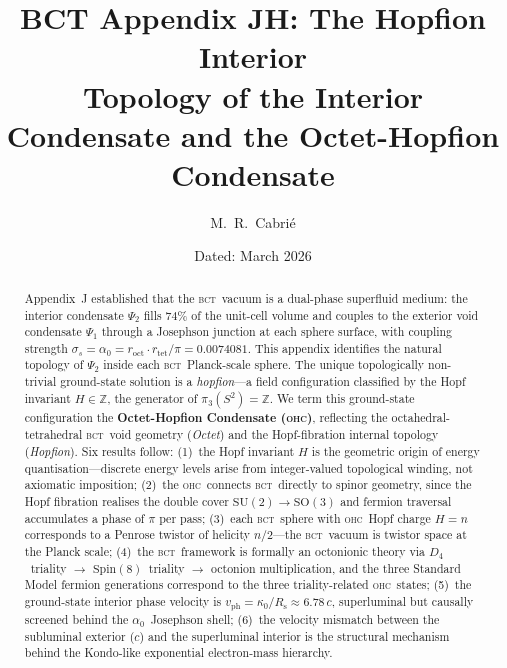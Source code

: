 \documentclass[aps,prl,preprint,superscriptaddress,floatfix]{revtex4-2}
\newcommand{\roct}{r_{\mathrm{oct}}}
\newcommand{\rtet}{r_{\mathrm{tet}}}
\newcommand{\az}{\alpha_0}
\newcommand{\BCT}{\textsc{bct}}
\newcommand{\OHC}{\textsc{ohc}}
\newcommand{\Psiint}{\Psi_2}
\newcommand{\Psiext}{\Psi_1}
\newcommand{\Rsph}{R_{\mathrm{s}}}
\newcommand{\kz}{\kappa_0}
\newcommand{\HopfN}{H}
\newcommand{\vph}{v_{\mathrm{ph}}}
\begin{document}
\title{%
  BCT Appendix JH: The Hopfion Interior\\
  Topology of the Interior Condensate and the Octet-Hopfion Condensate
}

\author{M.~R.~Cabri\'{e}}

\date{Dated: March 2026}

\begin{abstract}
Appendix~J established that the \BCT\ vacuum is a dual-phase superfluid
medium: the interior condensate $\Psiint$ fills $74\%$ of the unit-cell
volume and couples to the exterior void condensate $\Psiext$ through a
Josephson junction at each sphere surface, with coupling strength
$\sigma_s = \az = \roct\cdot\rtet/\pi = 0.0074081$.
This appendix identifies the natural topology of $\Psiint$ inside each
\BCT\ Planck-scale sphere.
The unique topologically non-trivial ground-state solution is a
\emph{hopfion}---a field configuration classified by the Hopf invariant
$\HopfN\in\mathbb{Z}$, the generator of $\pi_3(S^2)=\mathbb{Z}$.
We term this ground-state configuration the
\textbf{Octet-Hopfion Condensate (\OHC)}, reflecting the
octahedral-tetrahedral \BCT\ void geometry (\emph{Octet}) and the
Hopf-fibration internal topology (\emph{Hopfion}).
Six results follow:
(1)~the Hopf invariant $\HopfN$ is the geometric origin of energy
quantisation---discrete energy levels arise from integer-valued
topological winding, not axiomatic imposition;
(2)~the \OHC\ connects \BCT\ directly to spinor geometry, since the
Hopf fibration realises the double cover $\mathrm{SU}(2)\to\mathrm{SO}(3)$
and fermion traversal accumulates a phase of $\pi$ per pass;
(3)~each \BCT\ sphere with \OHC\ Hopf charge $\HopfN=n$ corresponds to a
Penrose twistor of helicity $n/2$---the \BCT\ vacuum is twistor space
at the Planck scale;
(4)~the \BCT\ framework is formally an octonionic theory via
$D_4$~triality $\to$ $\mathrm{Spin}(8)$~triality $\to$ octonion
multiplication, and the three Standard Model fermion generations correspond
to the three triality-related \OHC\ states;
(5)~the ground-state interior phase velocity is
$\vph = \kz/\Rsph \approx 6.78\,c$, superluminal but causally screened
behind the $\az$~Josephson shell;
(6)~the velocity mismatch between the subluminal exterior ($c$) and the
superluminal interior is the structural mechanism behind the
Kondo-like exponential electron-mass hierarchy.
\end{abstract}
\end{document}
